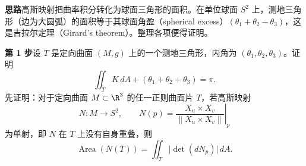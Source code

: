 \textbf{思路}\quad 高斯映射把曲率积分转化为球面三角形的面积。在单位球面 $S^2$ 上，测地三角形（边为大圆弧）的面积等于其球面角盈（spherical excess）$(\theta_1+\theta_2-\theta_3)$，这是吉拉尔定理（Girard's theorem）。整理各项便得证明。

\textbf{第 1 步}\quad 设 $T$ 是定向曲面 $(M,g)$ 上的一个测地三角形，内角为 $(\theta_1,\theta_2,\theta_3)$。证明
\[
  \iint_T K\,dA+(\theta_1+\theta_2+\theta_3)=\pi.
\]
先证明：对于定向曲面 $M\subset\R^3$ 的任一正则曲面片 $T$，若高斯映射
\[
  N\colon M\to S^2,\qquad
  N(p)=\left.\frac{X_u\times X_v}{\lVert X_u\times X_v\rVert}\right|_p
\]
为单射，即 $N$ 在 $T$ 上没有自身重叠，则
\[
  \operatorname{Area}(N(T))=\iint_T\lvert\det(dN_p)\rvert\,dA.
\]

